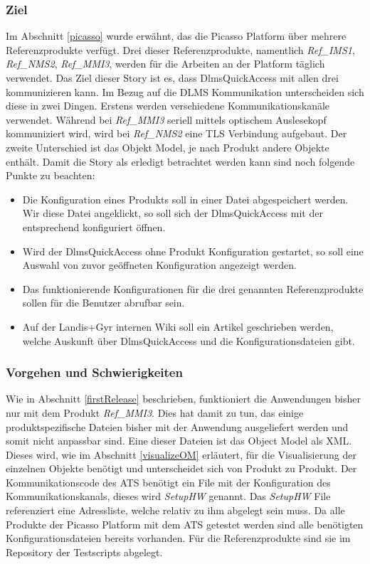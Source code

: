 \subsubsection{Ziel}
Im Abschnitt \ref{picasso} wurde erwähnt, das die Picasso Platform über mehrere Referenzprodukte verfügt.
Drei dieser Referenzprodukte, namentlich \textit{Ref\_IMS1}, \textit{Ref\_NMS2}, \textit{Ref\_MMI3}, werden für die Arbeiten an der Platform täglich verwendet.
Das Ziel dieser Story ist es, dass DlmsQuickAccess mit allen drei kommunizieren kann.
Im Bezug auf die \ac{DLMS} Kommunikation unterscheiden sich diese in zwei Dingen.
Erstens werden verschiedene Kommunikationskanäle verwendet. 
Während bei \textit{Ref\_MMI3} seriell mittels optischem Auslesekopf kommuniziert wird, wird bei \textit{Ref\_NMS2} eine \ac{TLS} Verbindung aufgebaut.
Der zweite Unterschied ist das Objekt Model, je nach Produkt andere Objekte enthält.
Damit die Story als erledigt betrachtet werden kann sind noch folgende Punkte zu beachten:
\begin{itemize}
   \item Die Konfiguration eines Produkts soll in einer Datei abgespeichert werden. Wir diese Datei angeklickt, so soll sich der DlmsQuickAccess mit der entsprechend konfiguriert öffnen. %
   \item Wird der DlmsQuickAccess ohne Produkt Konfiguration gestartet, so soll eine Auswahl von zuvor geöffneten Konfiguration angezeigt werden.
   \item Das funktionierende Konfigurationen für die drei genannten Referenzprodukte sollen für die Benutzer abrufbar sein.
   \item Auf der Landis+Gyr internen Wiki soll ein Artikel geschrieben werden, welche Auskunft über DlmsQuickAccess und die Konfigurationsdateien gibt.
\end{itemize}

\subsubsection{Vorgehen und Schwierigkeiten}
Wie in Abschnitt \ref{firstRelease} beschrieben, funktioniert die Anwendungen bisher nur mit dem Produkt \textit{Ref\_MMI3}.
Dies hat damit zu tun, das einige produktspezifische Dateien bisher mit der Anwendung ausgeliefert werden und somit nicht anpassbar sind.
Eine dieser Dateien ist das Object Model als XML. 
Dieses wird, wie im Abschnitt \ref{visualizeOM} erläutert, für die Visualisierung der einzelnen Objekte benötigt und unterscheidet sich von Produkt zu Produkt.
Der Kommunikationscode des \ac{ATS} benötigt ein File mit der Konfiguration des Kommunikationskanals, dieses wird \textit{SetupHW} genannt.
Das \textit{SetupHW} File referenziert eine Adressliste, welche relativ zu ihm abgelegt sein muss.
Da alle Produkte der Picasso Platform mit dem \ac{ATS} getestet werden sind alle benötigten Konfigurationsdateien bereits vorhanden.
Für die Referenzprodukte sind sie im Repository der Testscripts abgelegt.


